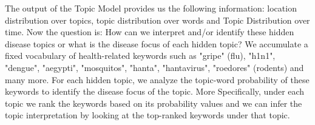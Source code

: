 \documentclass[conference]{IEEEtran}
\begin{document}
The output of the Topic Model provides us the following information: location 
distribution over topics, topic distribution over words and Topic Distribution 
over time. Now the question is: How can we interpret and/or identify these hidden 
disease topics or what is the disease focus of each hidden topic? We accumulate a fixed 
vocabulary of health-related keywords such as "gripe" (flu), "h1n1", "dengue", "aegypti", "mosquitos",
"hanta", "hantavirus", "roedores" (rodents) and many more. For each hidden topic, 
we analyze the topic-word probability of these keywords to identify the disease
focus of the topic. More Specifically, under each topic we rank the keywords 
based on its probability values and we can infer the topic interpretation by 
looking at the top-ranked keywords under that topic. 

%
%
\end{document}
